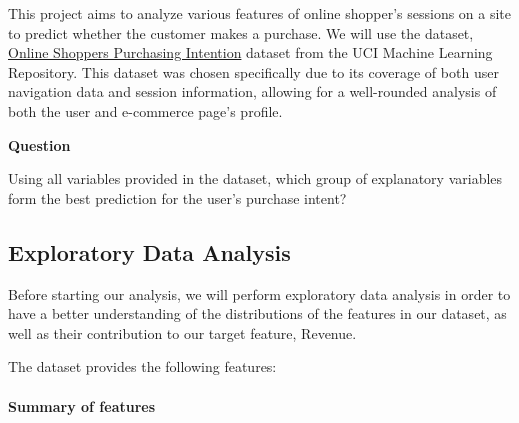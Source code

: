 \documentclass[
  letterpaper,
  DIV=11,
  numbers=noendperiod]{scrartcl}
\let\oldparagraph\paragraph
\renewcommand{\paragraph}[1]{\oldparagraph{#1}\mbox{}}
\begin{document}
This project aims to analyze various features of online shopper's
sessions on a site to predict whether the customer makes a purchase. We
will use the dataset,
\href{https://archive.ics.uci.edu/dataset/468/online+shoppers+purchasing+intention+dataset}{Online
Shoppers Purchasing Intention} dataset from the UCI Machine Learning
Repository. This dataset was chosen specifically due to its coverage of
both user navigation data and session information, allowing for a
well-rounded analysis of both the user and e-commerce page's profile.

\textbf{Question}

Using all variables provided in the dataset, which group of explanatory
variables form the best prediction for the user's purchase intent?

\subsection{Exploratory Data Analysis}\label{exploratory-data-analysis}

Before starting our analysis, we will perform exploratory data analysis
in order to have a better understanding of the distributions of the
features in our dataset, as well as their contribution to our target
feature, Revenue.

The dataset provides the following features:

\paragraph{Summary of features}\label{summary-of-features}
\end{document}
